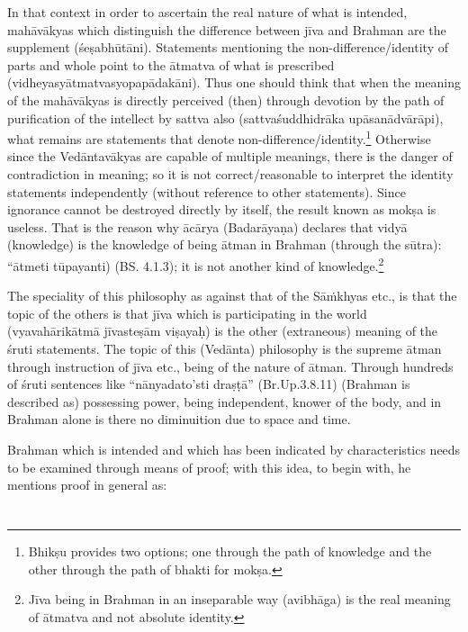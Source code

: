 In that context in order to ascertain the real nature of what is intended, mahāvākyas which distinguish the difference between jīva and Brahman are the supplement (śeṣabhūtāni). Statements mentioning the non-difference/identity of parts and whole point to the ātmatva of what is prescribed (vidheyasyātmatvasyopapādakāni). Thus one should think that when the meaning of the mahāvākyas is directly perceived (then) through devotion by the path of purification of the intellect by sattva also (sattvaśuddhidrāka upāsanādvārāpi),  what remains are statements that denote non-difference/identity.\footnote{Bhikṣu provides two options; one through the path of knowledge and the other through the path of bhakti for mokṣa.} Otherwise since the Vedāntavākyas are capable of multiple meanings, there is the danger of contradiction in meaning; so it is not correct/reasonable to interpret the identity statements independently (without reference to other statements). Since ignorance cannot be destroyed directly by itself, the result known as mokṣa is useless. That is the reason why ācārya (Badarāyaṇa) declares that vidyā (knowledge) is the knowledge of being ātman in Brahman (through the sūtra): “ātmeti tūpayanti) (BS. 4.1.3); it is not another kind of knowledge.\footnote{Jīva being in Brahman in an inseparable way (avibhāga) is the real meaning of ātmatva and not absolute identity.} 

The speciality of this philosophy as against that of the Sāṁkhyas etc., is that the topic of the others is that jīva which is participating in the world (vyavahārikātmā jīvasteṣām viṣayaḥ) is the other (extraneous) meaning of the śruti statements. The topic of this (Vedānta) philosophy is the supreme ātman through instruction of jīva etc., being of the nature of ātman. Through hundreds of śruti sentences like “nānyadato’sti draṣṭā” (Br.Up.3.8.11) (Brahman is described as) possessing power, being independent, knower of the body, and in Brahman alone is there no diminuition due to space and time.

Brahman which is intended and which has been indicated by characteristics needs to be examined through means of proof; with this idea, to begin with, he mentions proof in general as:

\section*{}

